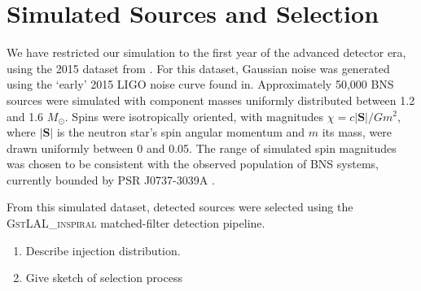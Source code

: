 \section{Simulated Sources and Selection}

We have restricted our simulation to the first year of the advanced detector era, using the 2015 dataset from \cite{Singer_2014}.  For this dataset, Gaussian noise was generated using the `early' 2015 LIGO noise curve found in\cite{Barsotti:2012}.  Approximately 50,000 BNS sources were simulated with component masses uniformly distributed between 1.2 and 1.6 $M_\odot$.  Spins were isotropically oriented, with magnitudes $\chi = c |\mathbf{S}|/G m^2$, where $|\mathbf{S}|$ is the neutron star's spin angular momentum and $m$ its mass, were drawn uniformly between 0 and 0.05.  The range of simulated spin magnitudes was chosen to be consistent with the observed population of BNS systems, currently bounded by PSR J0737-3039A \cite{Burgay_2003,Brown_2012}.

From this simulated dataset, detected sources were selected using the \textsc{GstLAL\_inspiral} matched-filter detection pipeline\cite{Cannon_2012}. 

\begin{enumerate}
\item Describe injection distribution.
\item Give sketch of selection process
\end{enumerate}